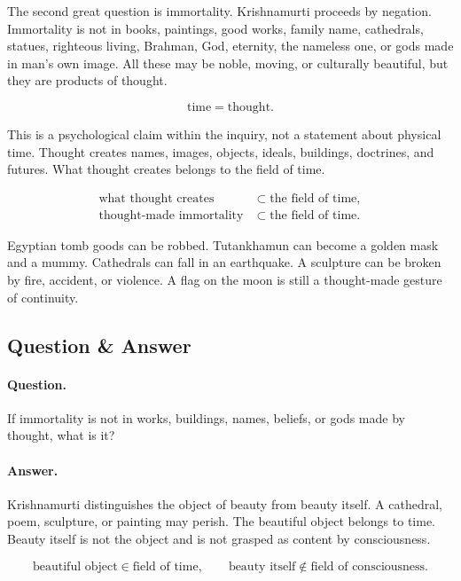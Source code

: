\documentclass[11pt,oneside]{book}
\begin{document}
The second great question is immortality. Krishnamurti proceeds by negation. Immortality is not in books, paintings, good works, family name, cathedrals, statues, righteous living, Brahman, God, eternity, the nameless one, or gods made in man's own image. All these may be noble, moving, or culturally beautiful, but they are products of thought.

\begin{equation}
\text{time} = \text{thought}.
\end{equation}

This is a psychological claim within the inquiry, not a statement about physical time. Thought creates names, images, objects, ideals, buildings, doctrines, and futures. What thought creates belongs to the field of time.

\begin{align}
\text{what thought creates} &\subset \text{the field of time},\\
\text{thought-made immortality} &\subset \text{the field of time}.
\end{align}

Egyptian tomb goods can be robbed. Tutankhamun can become a golden mask and a mummy. Cathedrals can fall in an earthquake. A sculpture can be broken by fire, accident, or violence. A flag on the moon is still a thought-made gesture of continuity.

\subsection{Question \& Answer}

\paragraph{Question.}
If immortality is not in works, buildings, names, beliefs, or gods made by thought, what is it?

\paragraph{Answer.}
Krishnamurti distinguishes the object of beauty from beauty itself. A cathedral, poem, sculpture, or painting may perish. The beautiful object belongs to time. Beauty itself is not the object and is not grasped as content by consciousness.

\begin{equation}
\text{beautiful object} \in \text{field of time},
\qquad
\text{beauty itself} \notin \text{field of consciousness}.
\end{equation}
\end{document}
